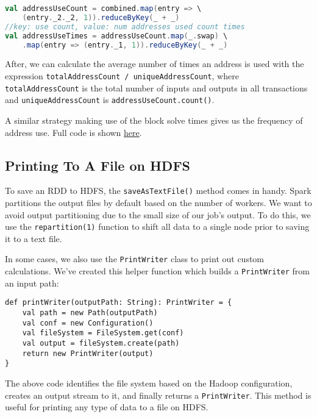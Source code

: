 \documentclass[9pt,twocolumn,twoside]{idsi}
\begin{document}
\begin{lstlisting}[language=Scala]
val addressUseCount = combined.map(entry => \
    (entry._2._2, 1)).reduceByKey(_ + _)
//key: use count, value: num addresses used count times
val addressUseTimes = addressUseCount.map(_.swap) \
    .map(entry => (entry._1, 1)).reduceByKey(_ + _)
\end{lstlisting}

After, we can calculate the average number of times an address is used with the expression \lstinline{totalAddressCount / uniqueAddressCount}, where \lstinline{totalAddressCount} is the total number of inputs and outputs in all transactions and \lstinline{uniqueAddressCount} is \lstinline{addressUseCount.count()}.

A similar strategy making use of the block solve times gives us the frequency of address use. Full code is shown \href{https://github.com/nishilshah17/idsi_bitcoin/blob/master/analyze_blockchain/src/main/scala/AddressReuse.scala}{here}.

\subsection{Printing To A File on HDFS}

To save an RDD to HDFS, the \lstinline{saveAsTextFile()} method comes in handy. Spark partitions the output files by default based on the number of workers. We want to avoid output partitioning due to the small size of our job's output. To do this, we use the \lstinline{repartition(1)} function to shift all data to a single node prior to saving it to a text file.

In some cases, we also use the \lstinline{PrintWriter} class to print out custom calculations. We've created this helper function which builds a \lstinline{PrintWriter} from an input path:

\begin{lstlisting}
def printWriter(outputPath: String): PrintWriter = {
    val path = new Path(outputPath)
    val conf = new Configuration()
    val fileSystem = FileSystem.get(conf)
    val output = fileSystem.create(path)
    return new PrintWriter(output)
}
\end{lstlisting}

The above code identifies the file system based on the Hadoop configuration, creates an output stream to it, and finally returns a \lstinline{PrintWriter}. This method is useful for printing any type of data to a file on HDFS.
\end{document}
